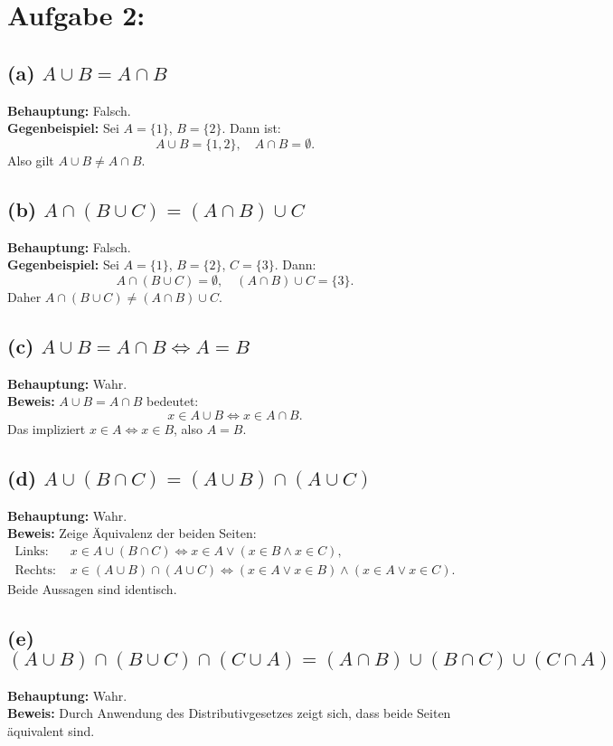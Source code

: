 \documentclass[a4paper]{scrartcl}
\begin{document}
\section*{Aufgabe 2:}

\subsection*{(a) \( A \cup B = A \cap B \)}
\textbf{Behauptung:} Falsch. \\
\textbf{Gegenbeispiel:} Sei \( A = \{1\} \), \( B = \{2\} \). Dann ist:
\[
A \cup B = \{1, 2\}, \quad A \cap B = \emptyset.
\]
Also gilt \( A \cup B \neq A \cap B \).

\subsection*{(b) \( A \cap (B \cup C) = (A \cap B) \cup C \)}
\textbf{Behauptung:} Falsch. \\
\textbf{Gegenbeispiel:} Sei \( A = \{1\} \), \( B = \{2\} \), \( C = \{3\} \). Dann:
\[
A \cap (B \cup C) = \emptyset, \quad (A \cap B) \cup C = \{3\}.
\]
Daher \( A \cap (B \cup C) \neq (A \cap B) \cup C \).

\subsection*{(c) \( A \cup B = A \cap B \iff A = B \)}
\textbf{Behauptung:} Wahr. \\
\textbf{Beweis:} \( A \cup B = A \cap B \) bedeutet:
\[
x \in A \cup B \Leftrightarrow x \in A \cap B.
\]
Das impliziert \( x \in A \Leftrightarrow x \in B \), also \( A = B \).

\subsection*{(d) \( A \cup (B \cap C) = (A \cup B) \cap (A \cup C) \)}
\textbf{Behauptung:} Wahr. \\
\textbf{Beweis:} Zeige Äquivalenz der beiden Seiten:
\begin{align*}
\text{Links: } & x \in A \cup (B \cap C) \Leftrightarrow x \in A \vee (x \in B \wedge x \in C), \\
\text{Rechts: } & x \in (A \cup B) \cap (A \cup C) \Leftrightarrow (x \in A \vee x \in B) \wedge (x \in A \vee x \in C).
\end{align*}
Beide Aussagen sind identisch.

\subsection*{(e) \( (A \cup B) \cap (B \cup C) \cap (C \cup A) = (A \cap B) \cup (B \cap C) \cup (C \cap A) \)}
\textbf{Behauptung:} Wahr. \\
\textbf{Beweis:} Durch Anwendung des Distributivgesetzes zeigt sich, dass beide Seiten äquivalent sind.
\end{document}
